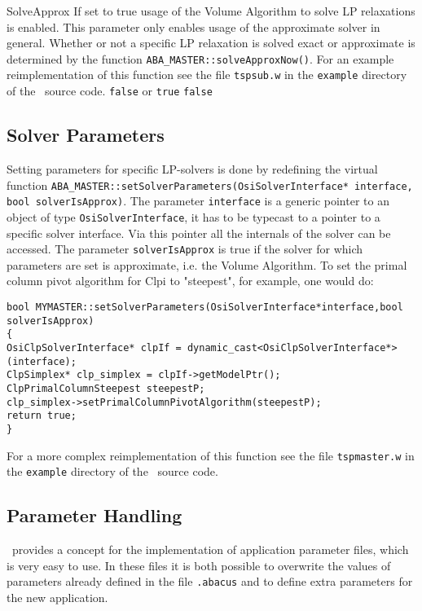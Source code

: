 \parameter
{SolveApprox}
{If set to true usage of the Volume Algorithm to solve LP relaxations is enabled.
This parameter only enables usage of the approximate solver in general. Whether or
not a specific LP relaxation is solved exact or approximate is determined by the 
function {\tt ABA\_MASTER::solveApproxNow()}.}
For an example reimplementation of this function see the file {\tt tspsub.w}
in the {\tt example} directory of the \ABACUS\ source code.
{{\tt false} or {\tt true}}
{{\tt false}}

\subsection{Solver Parameters}
\label{section:solverparameters}
Setting parameters for specific LP-solvers is done by redefining the virtual function
{\tt ABA\_MASTER::setSolverParameters(OsiSolverInterface* interface, bool solverIsApprox)}.
The parameter {\tt interface} is a generic pointer to an object of type 
{\tt OsiSolverInterface}, it has to be typecast to a pointer to a specific solver
interface. Via this pointer all the internals of the solver can be accessed.
The parameter {\tt solverIsApprox} is true if the solver for which parameters
are set is approximate, i.e. the Volume Algorithm.
To set the primal column pivot algorithm for Clpi to "steepest", for example,
one would do:
\begin{verbatim}
bool MYMASTER::setSolverParameters(OsiSolverInterface*interface,bool solverIsApprox)
{
OsiClpSolverInterface* clpIf = dynamic_cast<OsiClpSolverInterface*> (interface);
ClpSimplex* clp_simplex = clpIf->getModelPtr();
ClpPrimalColumnSteepest steepestP;
clp_simplex->setPrimalColumnPivotAlgorithm(steepestP);
return true;
}
\end{verbatim}
For a more complex reimplementation of this function see the file {\tt tspmaster.w}
in the {\tt example} directory of the \ABACUS\ source code.

\subsection{Parameter Handling}
\label{section:parameterHandling}
\noindent
\ABACUS\ provides a concept for the implementation
of application parameter files, which is very easy to use. 
In these files it is both possible
to overwrite the values of parameters already defined in the file
{\tt .abacus}
and to define extra parameters for the new application.

